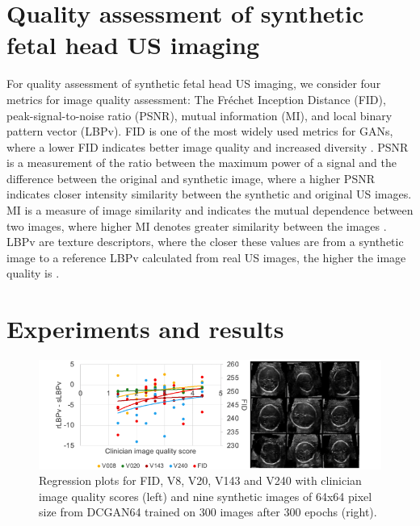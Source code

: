 \documentclass[runningheads]{llncs}
\begin{document}
\section{Quality assessment of synthetic fetal head US imaging}
For quality assessment of synthetic fetal head US imaging, we consider four metrics for image quality assessment: The Fr\'echet Inception Distance (FID), peak-signal-to-noise ratio (PSNR), mutual information (MI), and local binary pattern vector (LBPv). 
FID is one of the most widely used metrics for GANs, where a lower FID indicates better image quality and increased diversity \cite{heusel2017}.
PSNR is a measurement of the ratio between the maximum power of a signal and the difference between the original and synthetic image, where a higher PSNR indicates closer intensity similarity between the synthetic and original US images. 
MI is a measure of image similarity and indicates the mutual dependence between two images, where higher MI denotes greater similarity between the images \cite{wang2019}.
LBPv are texture descriptors, where the closer these values are from a synthetic image to a reference LBPv calculated from real US images, the higher the image quality is \cite{singh2018}. 

\section{Experiments and results}
\begin{figure}
\includegraphics[width=\textwidth]{../figures/results/versions/drawing-v02.png}%
\caption{Regression plots for FID, V8, V20, V143 and V240 with clinician image quality scores (left) and nine synthetic images of 64x64 pixel size from DCGAN64 trained on 300 images after 300 epochs (right).}\label{fig2}
\end{figure}
\end{document}
